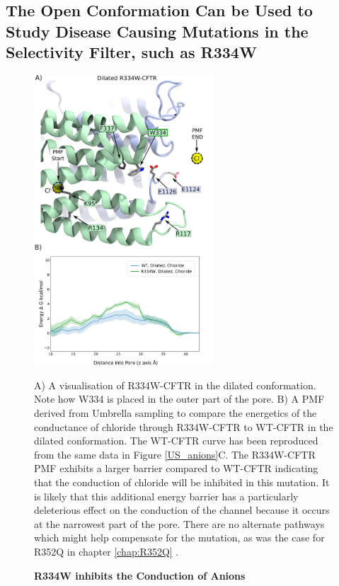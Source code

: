 \subsection{The Open Conformation Can be Used to Study Disease Causing Mutations in the Selectivity Filter, such as R334W}


\begin{figure}
	\begin{center}
		\includegraphics[width=0.6\textwidth]{figures/opening/R334W_pmf_combined.pdf}
	\end{center}
	\captionsetup{singlelinecheck = false, justification=raggedright}
	\caption[R334W Inhibits the Conduction of Anions] {\textbf{R334W inhibits the Conduction of Anions}}{A) A visualisation of R334W-CFTR in the dilated conformation. Note how W334 is placed in the outer part of the pore. B) A PMF derived from Umbrella sampling to compare the energetics of the conductance of chloride through R334W-CFTR to WT-CFTR in the dilated conformation. The WT-CFTR curve has been reproduced from the same data in Figure \ref{US_anions}C. The R334W-CFTR PMF exhibits a larger barrier compared to WT-CFTR indicating that the conduction of chloride will be inhibited in this mutation. It is likely that this additional energy barrier has a particularly deleterious effect on the conduction of the channel because it occurs at the narrowest part of the pore. There are no alternate pathways which might help compensate for the mutation, as was the case for R352Q in chapter \ref{chap:R352Q} \cite{wong2022a}.  }
	\label{R334_pmf}
\end{figure}

